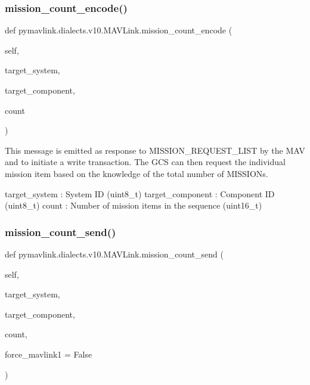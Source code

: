 \begin{DoxyVerb}
\begin{DoxyVerb}
\begin{DoxyVerb}
\begin{DoxyVerb}
\subsubsection{\texorpdfstring{mission\+\_\+count\+\_\+encode()}{mission\_count\_encode()}}
{\footnotesize\ttfamily def pymavlink.\+dialects.\+v10.\+M\+A\+V\+Link.\+mission\+\_\+count\+\_\+encode (\begin{DoxyParamCaption}\item[{}]{self,  }\item[{}]{target\+\_\+system,  }\item[{}]{target\+\_\+component,  }\item[{}]{count }\end{DoxyParamCaption})}

\begin{DoxyVerb}This message is emitted as response to MISSION_REQUEST_LIST by the MAV
and to initiate a write transaction. The GCS can then
request the individual mission item based on the
knowledge of the total number of MISSIONs.

target_system             : System ID (uint8_t)
target_component          : Component ID (uint8_t)
count                     : Number of mission items in the sequence (uint16_t)\end{DoxyVerb}
 \mbox{\label{classpymavlink_1_1dialects_1_1v10_1_1MAVLink_ad32fea844a012afa51e3f49c991c39ea}} 
\subsubsection{\texorpdfstring{mission\+\_\+count\+\_\+send()}{mission\_count\_send()}}
{\footnotesize\ttfamily def pymavlink.\+dialects.\+v10.\+M\+A\+V\+Link.\+mission\+\_\+count\+\_\+send (\begin{DoxyParamCaption}\item[{}]{self,  }\item[{}]{target\+\_\+system,  }\item[{}]{target\+\_\+component,  }\item[{}]{count,  }\item[{}]{force\+\_\+mavlink1 = {\ttfamily False} }\end{DoxyParamCaption})}


\end{DoxyVerb}
\end{DoxyVerb}
\end{DoxyVerb}
\end{DoxyVerb}
